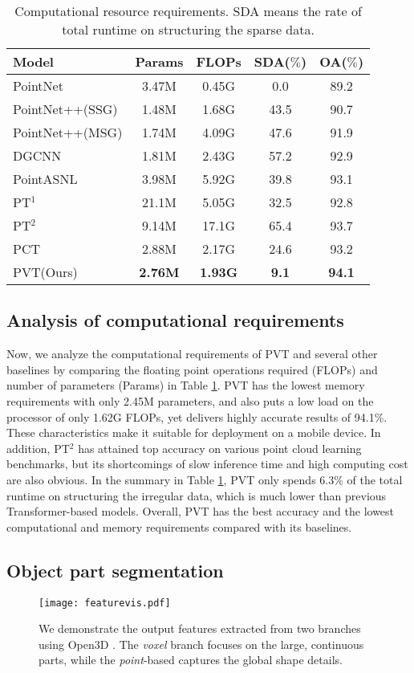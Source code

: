 \documentclass[10pt,twocolumn,letterpaper]{article}
\begin{document}
\begin{table}  
\centering
\begin{center} 
\begin{tabular}{|l|cccc|}   
\hline
Model & Params & FLOPs & SDA($\%$) & OA($\%$)\\
\hline
PointNet & 3.47M & 0.45G & 0.0 & 89.2  \\
PointNet++(SSG) & 1.48M & 1.68G &43.5& 90.7\\
PointNet++(MSG) & 1.74M & 4.09G &47.6& 91.9  \\
DGCNN  & 1.81M & 2.43G &57.2& 92.9 \\
\hline
PointASNL  & 3.98M & 5.92G &39.8& 93.1 \\
PT$^1$  & 21.1M & 5.05G &32.5& 92.8\\
PT$^2$  & 9.14M & 17.1G &65.4 & 93.7\\
PCT & 2.88M & 2.17G&24.6& 93.2\\
PVT(Ours) & \textbf{2.76M}& \textbf{1.93G} & \textbf{9.1} &  \textbf{94.1}\\
\hline
\end{tabular}  
\end{center}  
\caption{Computational resource requirements. SDA means the rate of total runtime on structuring the sparse data.}
\label{computational}
\end{table} 
\subsection{Analysis of computational requirements}
Now, we analyze the computational requirements of PVT and several other baselines by comparing the floating point operations required (FLOPs) and number of parameters (Params) in Table \ref{computational}. PVT has the lowest memory requirements with only 2.45M parameters, and also puts a low load on the processor of only 1.62G FLOPs, yet delivers highly accurate results of 94.1\%. These characteristics
make it suitable for deployment on a mobile device. In addition, PT$^2$ has attained top accuracy on various point cloud learning benchmarks, but its shortcomings of slow inference time and high computing cost are also obvious.
In the summary in Table \ref{computational}, PVT only spends 6.3\% of the total runtime on structuring the irregular data, which is much lower than previous Transformer-based models. 
Overall, PVT has the best accuracy and the lowest computational and memory requirements compared with its baselines. 
\subsection{Object part segmentation}
\begin{figure*}
    \centering
     \texttt{[image: featurevis.pdf]}
    \caption{We demonstrate the output features extracted from two branches using Open3D \cite{open3d}. The \emph{voxel} branch focuses on the large, continuous parts, while the \emph{point}-based captures the global shape details.}
    \label{fig:disentangle}
\end{figure*}
\end{document}
